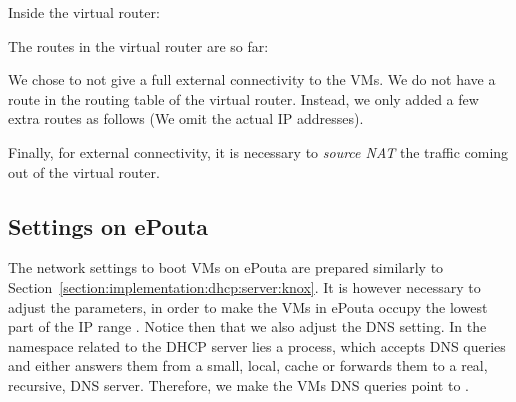 
Inside the virtual router:


The routes in the virtual router are so far:


We chose to not give a full external connectivity to the VMs. We do
not have a  route in the routing table of the virtual
router. Instead, we only added a few extra routes as follows (We omit
the actual IP addresses).


Finally, for external connectivity, it is necessary to \emph{source
  NAT} the traffic coming out of the virtual router.


\subsection{Settings on ePouta}
\label{section:implementation:epouta}

The network settings to boot VMs on ePouta are prepared similarly to
Section~\ref{section:implementation:dhcp:server:knox}.
%
It is however necessary to adjust the parameters, in order to make the
VMs in ePouta occupy the lowest part of the IP range
.
%
Notice then that we also adjust the DNS setting. In the namespace
related to the DHCP server lies a  process, which accepts
DNS queries and either answers them from a small, local, cache or
forwards them to a real, recursive, DNS server. Therefore, we make the
VMs DNS queries point to .



